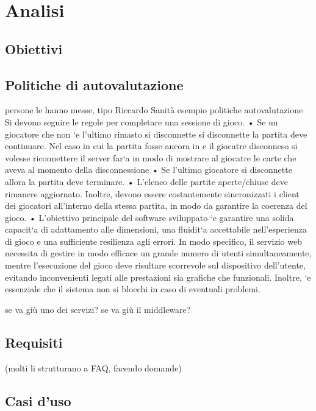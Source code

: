 \chapter{Analisi}
\label{ch:analisi} %
\section{Obiettivi}
\section{Politiche di autovalutazione} persone le hanno messe, tipo Riccardo Sanità
esempio politiche autovalutazione
Si devono seguire le regole per completare una sessione di gioco.
• Se un giocatore che non `e l’ultimo rimasto si disconnette si disconnette la
partita deve continuare. Nel caso in cui la partita fosse ancora in e il giocatre disconneso si volesse riconnettere il server far`a in modo di mostrare
al giocatre le carte che aveva al momento della disconnessione
• Se l’ultimo giocatore si disconnette allora la partita deve terminare.
• L’elenco delle partite aperte/chiuse deve rimanere aggiornato. Inoltre,
devono essere costantemente sincronizzati i client dei giocatori all’interno
della stessa partita, in modo da garantire la coerenza del gioco.
• L’obiettivo principale del software sviluppato `e garantire una solida capacit`a di adattamento alle dimensioni, una fluidit`a accettabile nell’esperienza
di gioco e una sufficiente resilienza agli errori. In modo specifico, il servizio web necessita di gestire in modo efficace un grande numero di utenti
simultaneamente, mentre l’esecuzione del gioco deve risultare scorrevole
sul dispositivo dell’utente, evitando inconvenienti legati alle prestazioni sia
grafiche che funzionali. Inoltre, `e essenziale che il sistema non si blocchi
in caso di eventuali problemi.

se va giù uno dei servizi? se va giù il middleware?
\section{Requisiti}
(molti li strutturano a FAQ, facendo domande)
\section{Casi d'uso}


